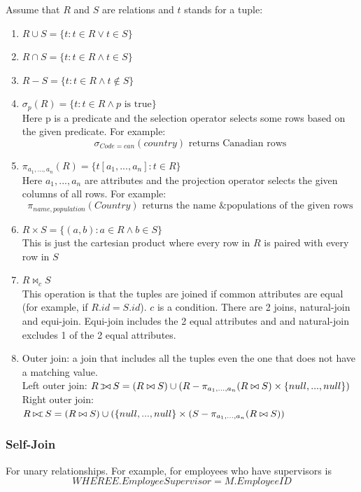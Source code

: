 \documentclass[12pt]{article}
\def\ojoin{\setbox0=\hbox{$\bowtie$}%
  \rule[-.02ex]{.25em}{.4pt}\llap{\rule[\ht0]{.25em}{.4pt}}}
\def\leftouterjoin{\mathbin{\ojoin\mkern-5.8mu\bowtie}}
\def\rightouterjoin{\mathbin{\bowtie\mkern-5.8mu\ojoin}}
\begin{document}
Assume that $R$ and $S$ are relations and $t$ stands for a tuple:
\begin{enumerate}
	\item{$R \cup S = \{ t : t \in R \vee t \in S  \}$}
	\item{$R \cap S = \{ t : t \in R \wedge t \in S  \}$}
	\item{$R - S = \{ t : t \in R \wedge t \not\in S  \}$}
	\item{
	$\sigma_p (R) = \{ t : t \in R \wedge p \text{ is true}  \}$\\
	Here p is a predicate and the selection operator selects some rows based on the given predicate. For example:
	$$\sigma_{Code =  can} (country) \text{ returns Canadian rows}$$
	}
	\item{
	$\pi_{a_1, ..., a_n} (R) = \{ t[a_1, ... , a_n] : t\in R \}$\\
	Here $a_1, ..., a_n$ are attributes and the projection operator selects the given columns of all rows. For example:
	$$\pi_{name,population} (Country) \text{ returns the name \& populations of the given rows}$$
	}
	\item{$R \times S = \{ (a,b) : a\in R \wedge b \in S \}$\\
	This is just the cartesian product where every row in $R$ is paired with every row in $S$}
	\item{$R \bowtie_c S$\\
	This operation is that the tuples are joined if common attributes are equal (for example, if $R.id = S.id$). $c$ is a condition. There are 2 joins, natural-join and equi-join. Equi-join includes the 2 equal attributes and and natural-join excludes 1 of the 2 equal attributes. }
	\item{
	Outer join: a join that includes all the tuples even the one that does not have a matching value.\\
	Left outer join: $R \leftouterjoin S = (R \bowtie S ) \cup (R - \pi_{a_1,...,a_n} (R \bowtie S) \times \{ null, ... ,null \})$ 
	Right outer join: $R \rightouterjoin S = (R \bowtie S ) \cup (\{ null, ... ,null \} \times (S - \pi_{a_1,...,a_n} (R \bowtie S))$ 
	}
\end{enumerate}

\subsubsection{Self-Join}

For unary relationships. For example, for employees who have supervisors is $$WHERE E.EmployeeSupervisor = M.EmployeeID$$
\end{document}
